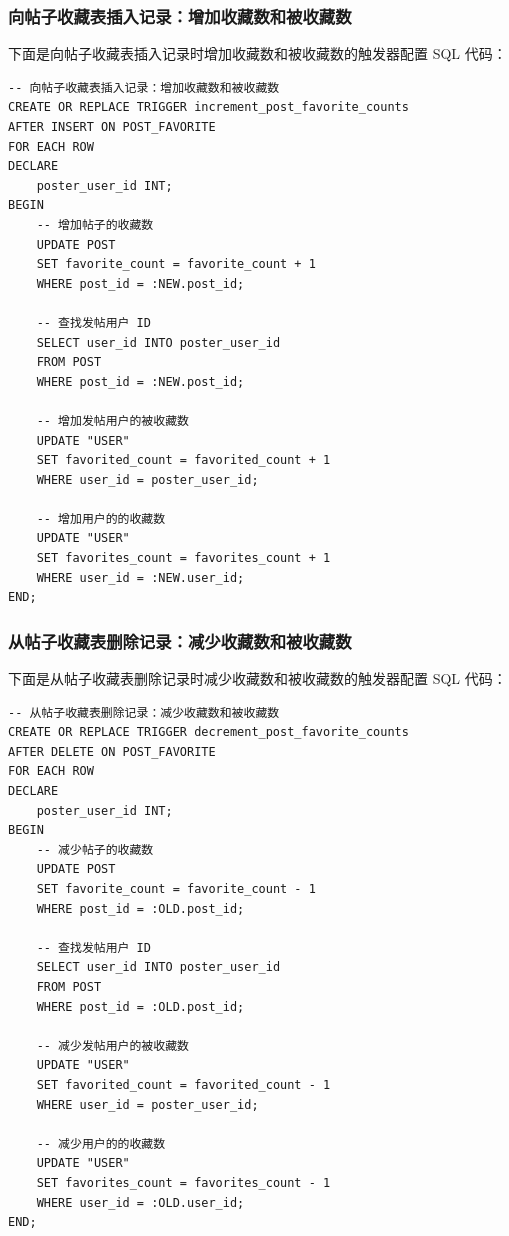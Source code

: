 \subsubsection{向帖子收藏表插入记录：增加收藏数和被收藏数}

下面是向帖子收藏表插入记录时增加收藏数和被收藏数的触发器配置 SQL 代码：

\begin{verbatim}
-- 向帖子收藏表插入记录：增加收藏数和被收藏数
CREATE OR REPLACE TRIGGER increment_post_favorite_counts
AFTER INSERT ON POST_FAVORITE
FOR EACH ROW
DECLARE
    poster_user_id INT;
BEGIN
    -- 增加帖子的收藏数
    UPDATE POST
    SET favorite_count = favorite_count + 1
    WHERE post_id = :NEW.post_id;

    -- 查找发帖用户 ID
    SELECT user_id INTO poster_user_id
    FROM POST
    WHERE post_id = :NEW.post_id;

    -- 增加发帖用户的被收藏数
    UPDATE "USER"
    SET favorited_count = favorited_count + 1
    WHERE user_id = poster_user_id;

    -- 增加用户的的收藏数
    UPDATE "USER"
    SET favorites_count = favorites_count + 1
    WHERE user_id = :NEW.user_id;
END;
\end{verbatim}

\subsubsection{从帖子收藏表删除记录：减少收藏数和被收藏数}

下面是从帖子收藏表删除记录时减少收藏数和被收藏数的触发器配置 SQL 代码：

\begin{verbatim}
-- 从帖子收藏表删除记录：减少收藏数和被收藏数
CREATE OR REPLACE TRIGGER decrement_post_favorite_counts
AFTER DELETE ON POST_FAVORITE
FOR EACH ROW
DECLARE
    poster_user_id INT;
BEGIN
    -- 减少帖子的收藏数
    UPDATE POST
    SET favorite_count = favorite_count - 1
    WHERE post_id = :OLD.post_id;

    -- 查找发帖用户 ID
    SELECT user_id INTO poster_user_id
    FROM POST
    WHERE post_id = :OLD.post_id;

    -- 减少发帖用户的被收藏数
    UPDATE "USER"
    SET favorited_count = favorited_count - 1
    WHERE user_id = poster_user_id;

    -- 减少用户的的收藏数
    UPDATE "USER"
    SET favorites_count = favorites_count - 1
    WHERE user_id = :OLD.user_id;
END;
\end{verbatim}

